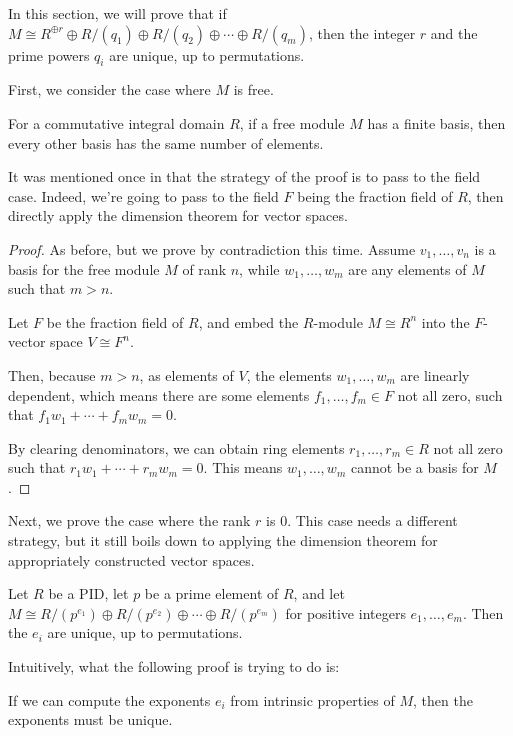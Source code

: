 In this section, we will prove that if $M \cong R^{\oplus r} \oplus R/(q_1) \oplus R/(q_2) \oplus \cdots
\oplus R/(q_m)$, then the integer $r$ and the prime powers $q_i$ are unique, up to permutations.

First, we consider the case where $M$ is free.

\begin{theorem}
	For a commutative integral domain $R$,
	if a free module $M$ has a finite basis, then every other basis has the same number of elements.
\end{theorem}
It was mentioned once in  that the strategy of the proof is to pass to the
field case. Indeed, we're going to pass to the field $F$ being the fraction field of $R$,
then directly apply the dimension theorem for vector spaces.
\begin{proof}
	As before, but we prove by contradiction this time.
	Assume $v_1, \dots, v_n$ is a basis for the free module $M$ of rank $n$,
	while $w_1, \dots, w_m$ are any elements of $M$ such that $m > n$.

	Let $F$ be the fraction field of $R$, and embed the $R$-module $M \cong R^n$
	into the $F$-vector space $V \cong F^n$.

	Then, because $m > n$, as elements of $V$, the elements $w_1, \dots, w_m$ are linearly dependent,
	which means there are some elements $f_1, \dots, f_m \in F$ not all zero, such that $f_1 w_1 + \cdots
	+ f_m w_m = 0$.

	By clearing denominators, we can obtain ring elements $r_1, \dots, r_m \in R$ not all zero
	such that $r_1 w_1 + \cdots + r_m w_m = 0$. This means $w_1, \dots, w_m$ cannot be a basis for $M$.
\end{proof}

Next, we prove the case where the rank $r$ is $0$.
This case needs a different strategy, but it still boils down to applying the dimension theorem for
appropriately constructed vector spaces.

\begin{theorem}
	\label{thm:uniqueness_primary_form_one_prime_torsion_module}
	Let $R$ be a PID, let $p$ be a prime element of $R$,
	and let $M \cong R/(p^{e_1}) \oplus R/(p^{e_2}) \oplus \cdots \oplus R/(p^{e_m})$
	for positive integers $e_1, \dots, e_m$.
	Then the $e_i$ are unique, up to permutations.
\end{theorem}

Intuitively, what the following proof is trying to do is:
\begin{moral}
	If we can compute the exponents $e_i$ from intrinsic properties of $M$, then the exponents must be
	unique.
\end{moral}

